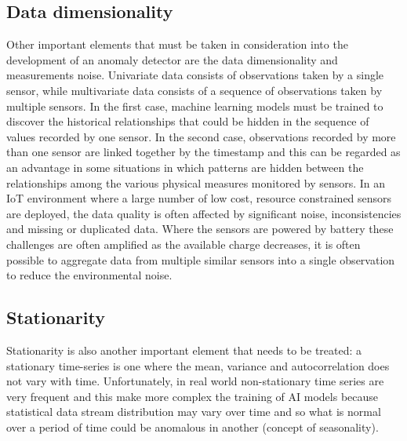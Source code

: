 \subsection{Data dimensionality}
Other important elements that must be taken in consideration into the development of an anomaly detector are the data dimensionality and measurements noise. Univariate data consists of observations taken by a single sensor, while multivariate data consists of a sequence of observations taken by multiple sensors. In the first case, machine learning models must be trained to discover the historical relationships that could be hidden in the sequence of values recorded by one sensor. In the second case, observations recorded by more than one sensor are linked together by the timestamp and this can be regarded as an advantage in some situations in which patterns are hidden between the relationships among the various physical measures monitored by sensors. In an IoT environment where a large number of low cost, resource constrained sensors are deployed, the data quality is often affected by significant noise, inconsistencies and missing or duplicated data. Where the sensors are powered by battery these challenges are often amplified as the available charge decreases, it is often possible to aggregate data from multiple similar sensors into a single observation to reduce the environmental noise.
\subsection{Stationarity}
Stationarity is also another important element that needs to be treated: a stationary time-series is one where the mean, variance and autocorrelation does not vary with time. Unfortunately, in real world non-stationary time series are very frequent and this make more complex the training of AI models because statistical data stream distribution may vary over time and so what is normal over a period of time could be anomalous in another (concept of seasonality).
